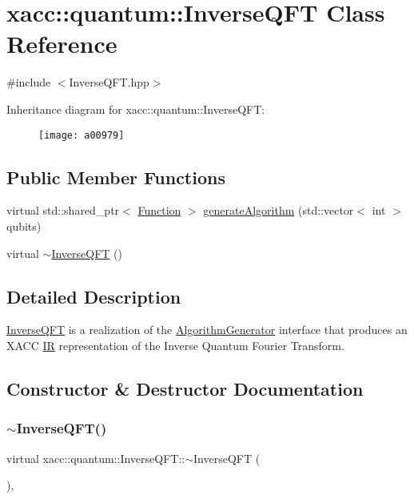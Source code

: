 \hypertarget{a00979}{}\section{xacc\+:\+:quantum\+:\+:Inverse\+Q\+FT Class Reference}
\label{a00979}


{\ttfamily \#include $<$Inverse\+Q\+F\+T.\+hpp$>$}

Inheritance diagram for xacc\+:\+:quantum\+:\+:Inverse\+Q\+FT\+:\begin{figure}[H]
\begin{center}
\leavevmode
\texttt{[image: a00979]}
\end{center}
\end{figure}
\subsection*{Public Member Functions}
\begin{DoxyCompactItemize}
\item 
virtual std\+::shared\+\_\+ptr$<$ \hyperlink{a01127}{Function} $>$ \hyperlink{a00979_af42e466bf02dbd60670d20aa55cfb08d}{generate\+Algorithm} (std\+::vector$<$ int $>$ qubits)
\item 
virtual \hyperlink{a00979_a731c10d28046424be74e4c0daa31d016}{$\sim$\+Inverse\+Q\+FT} ()
\end{DoxyCompactItemize}


\subsection{Detailed Description}
\hyperlink{a00979}{Inverse\+Q\+FT} is a realization of the \hyperlink{a01119}{Algorithm\+Generator} interface that produces an X\+A\+CC \hyperlink{a01151}{IR} representation of the Inverse Quantum Fourier Transform. 

\subsection{Constructor \& Destructor Documentation}
\mbox{\label{a00979_a731c10d28046424be74e4c0daa31d016}} 
\subsubsection{\texorpdfstring{$\sim$\+Inverse\+Q\+F\+T()}{~InverseQFT()}}
{\footnotesize\ttfamily virtual xacc\+::quantum\+::\+Inverse\+Q\+F\+T\+::$\sim$\+Inverse\+Q\+FT (\begin{DoxyParamCaption}{ }\end{DoxyParamCaption})\hspace{0.3cm}{\ttfamily [inline]}, {\ttfamily [virtual]}}

